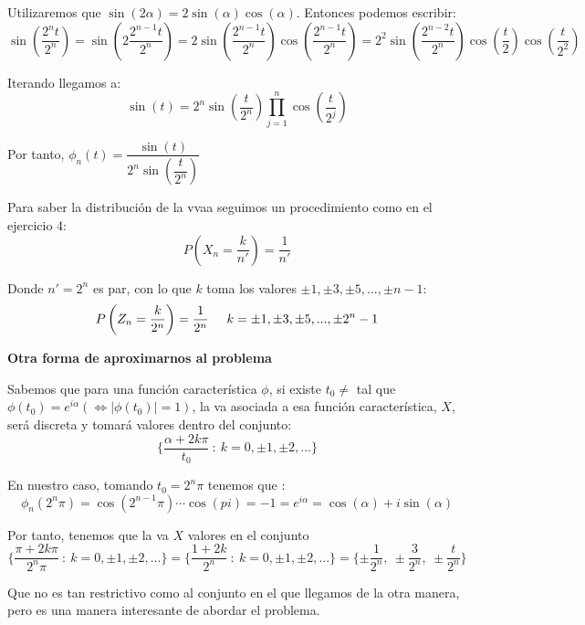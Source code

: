 \documentclass[openany]{book}
\begin{document}
\begin{exercise}
    $  $\\ 
    Utilizaremos que $ \sin(2 \alpha ) = 2 \sin(\alpha )\cos(\alpha) $. Entonces podemos escribir:
    $$ \sin\left(\dfrac{2^{n}t}{2^{n}}\right) = \sin\left(2 \dfrac{2^{n-1}t}{2^{n}}\right) = 2 \sin\left(\dfrac{2^{n-1}t}{2^{n}}\right) \cos\left(\dfrac{2^{n-1}t}{2^{n}}\right) = 2^2 \sin\left(\dfrac{2^{n-2}t}{2^{n}}\right) \cos\left(\dfrac{t}{2}\right) \cos\left(\dfrac{t}{2^2}\right) $$

    Iterando llegamos a:
    $$ \sin(t) = 2^{n}\sin\left(\dfrac{t}{2^{n}}\right) \prod_{j=1}^{n} \cos\left(\dfrac{t}{2^{j}}\right) $$
    
    Por tanto, $ \phi_n(t) = \dfrac{\sin(t)}{2^{n}\sin\left(\dfrac{t}{2^{n}}\right)} $

    Para saber la distribución de la vvaa seguimos un procedimiento como en el ejercicio 4:
    $$ P \left(X_n = \dfrac{k}{n'}\right) = \dfrac{1}{n'} $$

    Donde $ n' = 2^{n} $ es par, con lo que $ k $ toma los valores $ \pm 1, \pm 3,\pm 5,...,\pm n-1 $:
    $$ P\left(Z_n = \dfrac{k}{2^{n}}\right) = \dfrac{1}{2^{n}}\hspace{5mm} k = \pm 1, \pm 3,\pm 5, ...,\pm 2^{n}-1$$
    
    \begin{flushright}
        \textbf{Otra forma de aproximarnos al problema}
    \end{flushright}

    Sabemos que para una función característica $ \phi $, si existe $ t_0 \ne  $ tal que $ \phi(t_0) = e^{i \alpha} ( \iff |\phi(t_0)| = 1) $, la va asociada a esa función característica, $ X $, será discreta y tomará valores dentro del conjunto:
    $$ \{ \dfrac{\alpha +2k \pi}{t_0}\ :\ k = 0,\pm 1,\pm 2,...\} $$

    En nuestro caso, tomando $ t_0 = 2^{n}\pi $ tenemos que :
    $$ \phi_n(2^{n}\pi) = \cos(2^{n-1}\pi) \cdots \cos(pi) = -1 = e^{i \alpha } = \cos(\alpha)+i \sin(\alpha) $$
    
    Por tanto, tenemos que la va $ X $ valores en el conjunto
    $$ \{ \dfrac{\pi+2k \pi}{2^{n}\pi}\ :\ k = 0,\pm 1,\pm 2,...\} = \{ \dfrac{1+2k}{2^{n}}\ :\ k = 0,\pm 1,\pm 2,...\} = \{\pm \dfrac{1}{2^{n}},\ \pm \dfrac{3}{2^{n}},\ \pm \dfrac{t}{2^{n}}\} $$

    Que no es tan restrictivo como al conjunto en el que llegamos de la otra manera, pero es una manera interesante de abordar el problema.
\end{exercise}
\end{document}

